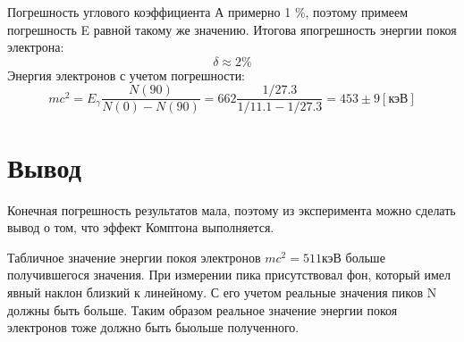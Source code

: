 \documentclass[a4paper,12pt]{article} %
\begin{document}
    Погрешность углового коэффициента А примерно 1 \%, поэтому примеем погрешность E равной такому же значению.
    Итогова япогрешность энергии покоя электрона:
    \begin{equation}
      \delta \approx 2 \%
    \end{equation}
    Энергия электронов с учетом погрешности:
    \begin{equation}
      mc^2 = E_\gamma \dfrac{N(90)}{N(0) - N(90)} = 662  \frac{1 / 27.3}{1 / 11.1 - 1 / 27.3} = 453 \pm 9[\text{кэВ}]
    \end{equation}
  \newpage

  \section{Вывод}
    
    Конечная погрешность результатов мала, поэтому из эксперимента можно сделать вывод о том, что эффект Комптона выполняется.\par 
    Табличное значение энергии покоя электронов $mc^2 = 511\text{кэВ}$ больше получившегося значения.
    При измерении пика присутствовал фон, который имел явный наклон близкий к линейному.
    С его учетом реальные значения пиков N должны быть больше.
    Таким образом реальное значение энергии покоя электронов тоже должно быть быольше полученного. 
    
\end{document}
